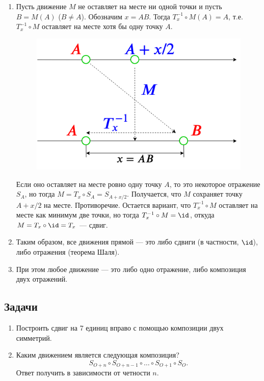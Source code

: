 \begin{enumerate}
\item Пусть движение $M$ не оставляет на месте ни одной точки и пусть $B=M(A)$ ($B\ne A$). Обозначим $x=AB$. Тогда $T_{x}^{-1}\circ M(A)=A$, т.е. $T_{x}^{-1}\circ M$ оставляет на месте хотя бы одну точку $A$.
\begin{figure}[hbt!]
\begin{center}
\includegraphics[scale=0.35]{LineMovingx.png}
\end{center}
\caption{}\label{LineMovingx}
\end{figure}

Если оно оставляет на месте ровно одну точку $A$, то это некоторое отражение $S_A$, но тогда $M=T_x\circ S_A=S_{A+x/2}$. Получается, что $M$ сохраняет точку $A+x/2$ на месте. Противоречие. Остается вариант, что $T_{x}^{-1}\circ M$ оставляет на месте как минимум две точки, но тогда $T_{x}^{-1}\circ M=\id$, откуда $M=T_x\circ \id=T_x$ --- сдвиг.
\item Таким образом, все движения прямой --- это либо сдвиги (в частности, $\id$), либо отражения (теорема Шаля).
\item При этом любое движение --- это либо одно отражение, либо композиция двух отражений.
\end{enumerate}
\subsection*{Задачи}
\begin{enumerate}
\item Построить сдвиг на 7 единиц вправо с помощью композиции двух симметрий.
\item Каким движением является следующая композиция?
$$
S_{O+n}\circ S_{O+n-1}\circ \dots\circ S_{O+1}\circ S_O.
$$
Ответ получить в зависимости от четности $n$.
\end{enumerate}


